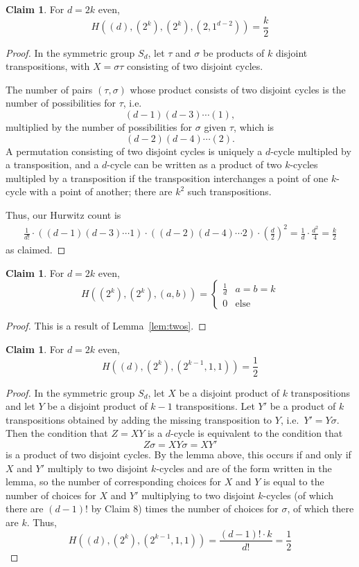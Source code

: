 \documentclass[11pt]{article}           %
\theoremstyle{definition}
\newtheorem{claim}[thm]{Claim}
\begin{document}
\begin{claim}
  \label{claim:twoscomplete}
For $d=2k$ even,
\[
H((d),(2^k),(2^k),(2,1^{d-2}))=\frac k2
\]
\end{claim}
\begin{proof}
  In the symmetric group $S_d$, let $\tau$ and $\sigma$
  be products of $k$ disjoint transpositions, with $X=\sigma\tau$ consisting
  of two disjoint cycles.

  
  The number of pairs $(\tau,\sigma)$ whose product consists of two
  disjoint cycles is the number of possibilities for $\tau$, i.e.
  \[
  (d-1)(d-3)\cdots (1),
  \]
  multiplied by the number of possibilities for $\sigma$ given $\tau$, which is
  \[
  (d-2)(d-4)\cdots (2).\]
  A permutation consisting of two disjoint cycles
  is uniquely a $d$-cycle multipled by a transposition, and
  a $d$-cycle can be written as a product of two $k$-cycles multipled by a
  transposition if the transposition interchanges a point of one $k$-cycle
  with a point of another; there are $k^2$ such transpositions.

  Thus, our Hurwitz count is
  \begin{align*}
  \frac 1{d!}\cdot ((d-1)(d-3)\cdots 1)\cdot  ((d-2)(d-4)\cdots 2)\cdot\left(\frac d2\right)^2 = \frac{1}{d}\cdot\frac{d^2}{4}=\frac k2
  \end{align*}
  as claimed.
\end{proof}

\begin{claim}
  \label{claim:twoscycles}
  For $d=2k$ even,
  \[
  H((2^k),(2^k),(a,b))=\begin{cases}
  \frac 1d & a=b=k \\
  0 & \text{else}
  \end{cases}
  \]
\end{claim}
\begin{proof}
  This is a result of Lemma~\ref{lem:twos}.
  \end{proof}

\begin{claim}
  \label{claim:twoseven}
For $d=2k$ even,
\[
H((d),(2^k),(2^{k-1},1,1))=\frac 12
\]
\end{claim}
\begin{proof}
  In the symmetric group $S_d$, let $X$ be a disjoint product of $k$ transpositions
  and let $Y$ be a disjoint product of $k-1$ transpositions. Let $Y'$ be a product
  of $k$ transpositions obtained by adding the missing transposition to $Y$, i.e.\ $Y'=Y\sigma$.
  Then the condition that $Z=XY$ is a $d$-cycle is equivalent to the condition that
  \[
  Z\sigma=XY\sigma=XY'
  \]
  is a product of two disjoint cycles. By the lemma above,
  this occurs if and only if $X$ and $Y'$ multiply to two disjoint $k$-cycles and are of
  the form written in the lemma, so the number of corresponding choices
  for $X$ and $Y$ is equal to the number of choices for $X$ and $Y'$ multiplying
  to two disjoint $k$-cycles (of which there are $(d-1)!$ by Claim 8) times the number
  of choices for $\sigma$, of which there are $k$. Thus,
  \[
  H((d),(2^k),(2^{k-1},1,1))=\frac{(d-1)!\cdot k}{d!}=\frac 12
  \]
  
  \end{proof}
\end{document}
